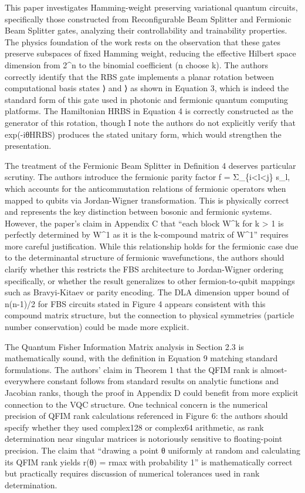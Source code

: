 \documentclass[10pt,letterpaper]{article}
\begin{document}
This paper investigates Hamming-weight preserving variational quantum circuits, specifically those constructed from Reconfigurable Beam Splitter and Fermionic Beam Splitter gates, analyzing their controllability and trainability properties. The physics foundation of the work rests on the observation that these gates preserve subspaces of fixed Hamming weight, reducing the effective Hilbert space dimension from 2\^{}n to the binomial coefficient (n choose k). The authors correctly identify that the RBS gate implements a planar rotation between computational basis states ⟩ and ⟩ as shown in Equation 3, which is indeed the standard form of this gate used in photonic and fermionic quantum computing platforms. The Hamiltonian HRBS in Equation 4 is correctly constructed as the generator of this rotation, though I note the authors do not explicitly verify that exp(-iθHRBS) produces the stated unitary form, which would strengthen the presentation.

The treatment of the Fermionic Beam Splitter in Definition 4 deserves particular scrutiny. The authors introduce the fermionic parity factor f = Σ\_\{i\textless l\textless j\} s\_l, which accounts for the anticommutation relations of fermionic operators when mapped to qubits via Jordan-Wigner transformation. This is physically correct and represents the key distinction between bosonic and fermionic systems. However, the paper's claim in Appendix C that ``each block W\^{}k for k \textgreater{} 1 is perfectly determined by W\^{}1 as it is the k-compound matrix of W\^{}1'' requires more careful justification. While this relationship holds for the fermionic case due to the determinantal structure of fermionic wavefunctions, the authors should clarify whether this restricts the FBS architecture to Jordan-Wigner ordering specifically, or whether the result generalizes to other fermion-to-qubit mappings such as Bravyi-Kitaev or parity encoding. The DLA dimension upper bound of n(n-1)/2 for FBS circuits stated in Figure 4 appears consistent with this compound matrix structure, but the connection to physical symmetries (particle number conservation) could be made more explicit.

The Quantum Fisher Information Matrix analysis in Section 2.3 is mathematically sound, with the definition in Equation 9 matching standard formulations. The authors' claim in Theorem 1 that the QFIM rank is almost-everywhere constant follows from standard results on analytic functions and Jacobian ranks, though the proof in Appendix D could benefit from more explicit connection to the VQC structure. One technical concern is the numerical precision of QFIM rank calculations referenced in Figure 6: the authors should specify whether they used complex128 or complex64 arithmetic, as rank determination near singular matrices is notoriously sensitive to floating-point precision. The claim that ``drawing a point θ uniformly at random and calculating its QFIM rank yields r(θ) = rmax with probability 1'' is mathematically correct but practically requires discussion of numerical tolerances used in rank determination.
\end{document}
